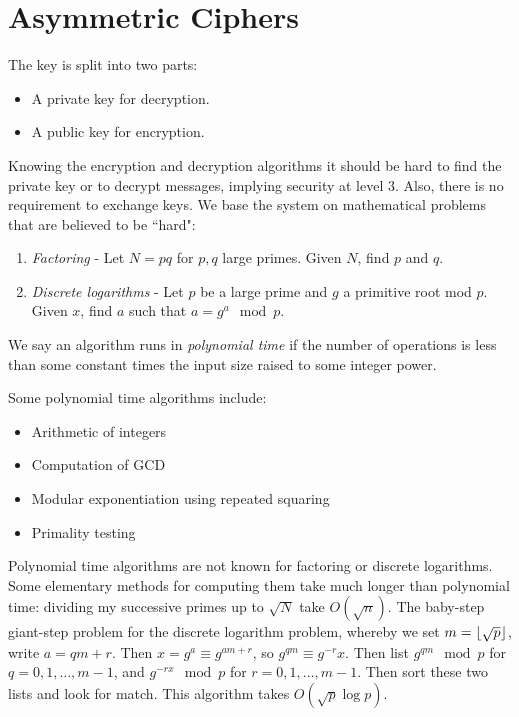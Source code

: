 \documentclass[10pt,a4paper]{article}
\begin{document}
\section{Asymmetric Ciphers}
The key is split into two parts:
\begin{itemize}
\item A private key for decryption.
\item A public key for encryption.
\end{itemize}
Knowing the encryption and decryption algorithms it should be hard to find the private key or to decrypt messages, implying security at level 3. Also, there is no requirement to exchange keys. We base the system on mathematical problems that are believed to be ``hard":
\begin{enumerate}
\item \emph{Factoring} - Let $N = pq$ for $p,q$ large primes. Given $N$, find $p$ and $q$.
\item \emph{Discrete logarithms} - Let $p$ be a large prime and $g$ a primitive root mod $p$. Given $x$, find $a$ such that $a = g^a \mod p$.
\end{enumerate}
We say an algorithm runs in \emph{polynomial time} if the number of operations is less than some constant times the input size raised to some integer power. 

Some polynomial time algorithms include:
\begin{itemize}
\item Arithmetic of integers
\item Computation of GCD
\item Modular exponentiation using repeated squaring
\item Primality testing
\end{itemize}
Polynomial time algorithms are not known for factoring or discrete logarithms. Some elementary methods for computing them take much longer than polynomial time: dividing my successive primes up to $\sqrt{N}$ take $O(\sqrt{n})$. The baby-step giant-step problem for the discrete logarithm problem, whereby we set $m = \lfloor \sqrt{p} \rfloor$, write $a = qm+r$. Then $x = g^a \equiv g^{am+r}$, so $g^{qm}\equiv g^{-r}x$. Then list $g^{qm}\mod p$ for $q = 0, 1, \ldots, m-1$, and $g^{-rx} \mod p$ for $r = 0,1, \ldots, m-1$. Then sort these two lists and look for match. This algorithm takes $O(\sqrt{p}\log p)$.
\end{document}

